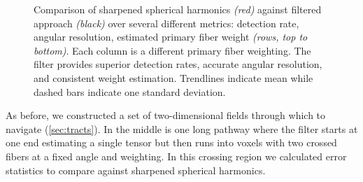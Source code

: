 \documentclass[final,hyperref]{gatech-thesis}
\begin{document}
\begin{figure}[t]
  \centering
  \caption{Comparison of sharpened spherical harmonics \textit{(red)} against
    filtered approach \textit{(black)} over several different metrics:
    detection rate, angular resolution, estimated primary fiber weight
    \textit{(rows, top to bottom)}.  Each column is a different primary fiber
    weighting.  The filter provides superior detection rates, accurate angular
    resolution, and consistent weight estimation.  Trendlines indicate mean
    while dashed bars indicate one standard deviation.}
  \label{fig:w_synthetic}
\end{figure}
As before, we constructed a set of two-dimensional fields through which to
navigate (\autoref{sec:tracts}).  In the middle is one long pathway where the
filter starts at one end estimating a single tensor but then runs into voxels
with two crossed fibers at a fixed angle and weighting.  In this crossing
region we calculated error statistics to compare against sharpened spherical
harmonics.
\end{document}
